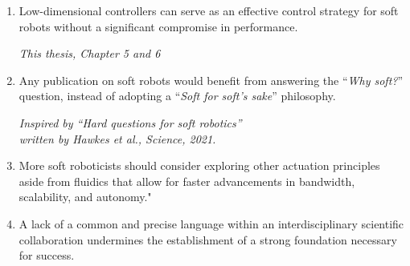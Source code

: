 \documentclass[a5paper]{article}
\begin{document}
\begin{enumerate}
  \item Low-dimensional controllers can serve as an effective control strategy for soft robots without a significant compromise in performance.
  \begin{flushright}
  \vspace{-2mm}
  \textit{This thesis, Chapter 5 and 6}
  \vspace{-1mm}
  \end{flushright}


  \item Any publication on soft robots would benefit from answering the ``\textit{Why soft?}'' question, instead of adopting a ``\textit{Soft for soft's sake}'' philosophy. 
  \begin{flushright}
  \vspace{-2mm}
  \textit{Inspired by ``Hard questions for soft robotics'' \\ written by Hawkes et al., Science, 2021.}
  \vspace{-1mm}
  \end{flushright}  
  
  \item More soft roboticists should consider exploring other actuation principles aside from fluidics that allow for faster advancements in bandwidth, scalability, and autonomy."

  \item A lack of a common and precise language within an interdisciplinary scientific collaboration undermines the establishment of a strong foundation necessary for success.




\end{enumerate}
\end{document}
